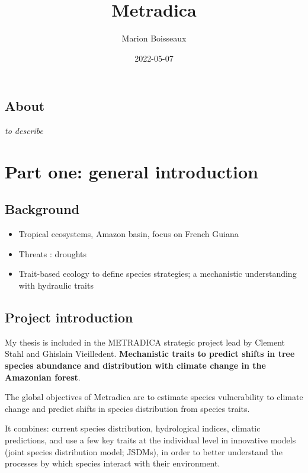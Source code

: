 \documentclass[
]{book}
\title{Metradica}
\author{Marion Boisseaux}
\date{2022-05-07}
\providecommand{\tightlist}{%
  \setlength{\itemsep}{0pt}\setlength{\parskip}{0pt}}
\begin{document}
\maketitle

{
\setcounter{tocdepth}{1}
\tableofcontents
}
\hypertarget{about}{%
\chapter{About}\label{about}}

\emph{to describe}

\hypertarget{part-part-one-general-introduction}{%
\part{Part one: general introduction}\label{part-part-one-general-introduction}}

\hypertarget{background}{%
\chapter{Background}\label{background}}

\begin{itemize}
\tightlist
\item
  Tropical ecosystems, Amazon basin, focus on French Guiana
\item
  Threats : droughts
\item
  Trait-based ecology to define species strategies; a mechanistic understanding with hydraulic traits
\end{itemize}

\hypertarget{project-introduction}{%
\chapter{Project introduction}\label{project-introduction}}

My thesis is included in the METRADICA strategic project lead by Clement Stahl and Ghislain Vieilledent. \textbf{Mechanistic traits to predict shifts in tree species abundance and distribution with climate change in the Amazonian forest}.

The global objectives of Metradica are to estimate species vulnerability to climate change and predict shifts in species distribution from species traits.

It combines: current species distribution, hydrological indices, climatic predictions, and use a few key traits at the individual level in innovative models (joint species distribution model; JSDMs), in order to better understand the processes by which species interact with their environment.
\end{document}
